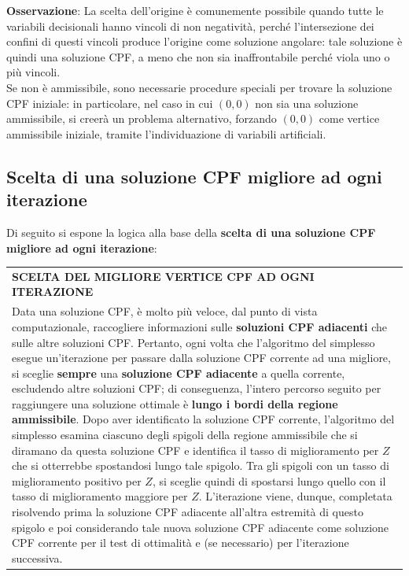 \documentclass[a4paper]{extarticle}
\renewcommand\arraystretch{}
\begin{document}
\vspace{1em}
\noindent
\textbf{Osservazione}: La scelta dell'origine è comunemente possibile quando tutte le variabili decisionali hanno vincoli di non negatività, perché l'intersezione dei confini di questi vincoli produce l'origine come soluzione angolare: tale soluzione è quindi una soluzione CPF, a meno che non sia inaffrontabile perché viola uno o più vincoli.\\
Se non è ammissibile, sono necessarie procedure speciali per trovare la soluzione CPF iniziale: in particolare, nel caso in cui $(0,0)$ non sia una soluzione ammissibile, si creerà un problema alternativo, forzando $(0,0)$ come vertice ammissibile iniziale, tramite l'individuazione di variabili artificiali.

\vspace{1em}
\subsection{Scelta di una soluzione CPF migliore ad ogni iterazione}
Di seguito si espone la logica alla base della \textbf{scelta di una soluzione CPF migliore ad ogni iterazione}:

\vspace{1em}
\setlength{\tabcolsep}{14pt}
\renewcommand{\arraystretch}{2}
\noindent
\begin{tabularx}{\textwidth}{@{}|P|@{}}
    \hline
    {\textbf{SCELTA DEL MIGLIORE VERTICE CPF AD OGNI ITERAZIONE}}\\
    \parbox{\linewidth}{Data una soluzione CPF, è molto più veloce, dal punto di vista computazionale, raccogliere informazioni sulle \textbf{soluzioni CPF adiacenti} che sulle altre soluzioni CPF.\\
    Pertanto, ogni volta che l'algoritmo del simplesso esegue un'iterazione per passare dalla soluzione CPF corrente ad una migliore, si sceglie \textbf{sempre} una \textbf{soluzione CPF adiacente} a quella corrente, escludendo altre soluzioni CPF; di conseguenza, l'intero percorso seguito per raggiungere una soluzione ottimale è \textbf{lungo i bordi della regione ammissibile}.\\
    Dopo aver identificato la soluzione CPF corrente, l'algoritmo del simplesso esamina ciascuno degli spigoli della regione ammissibile che si diramano da questa soluzione CPF e identifica il tasso di miglioramento per $Z$ che si otterrebbe spostandosi lungo tale spigolo. Tra gli spigoli con un tasso di miglioramento positivo per $Z$, si sceglie quindi di spostarsi lungo quello con il tasso di miglioramento maggiore per $Z$.\\
    L'iterazione viene, dunque, completata risolvendo prima la soluzione CPF adiacente all'altra estremità di questo spigolo e poi considerando tale nuova soluzione CPF adiacente come soluzione CPF corrente per il test di ottimalità e (se necessario) per l'iterazione successiva.\vspace{3mm}}\\
    \hline
\end{tabularx}
\end{document}
